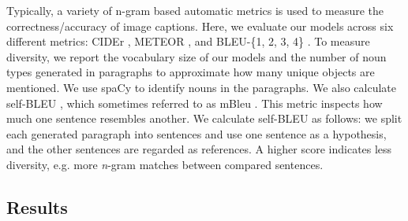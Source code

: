 \documentclass[11pt,a4paper]{article}
\begin{document}
Typically, a variety of n-gram based automatic metrics is used to measure the correctness/accuracy of image captions.
Here, we evaluate our models across six different metrics: CIDEr \cite{vedantam2014cider}, METEOR \cite{meteor14}, and BLEU-\{1, 2, 3, 4\} \cite{bleu}.
To measure diversity, we report the vocabulary size of our models and the number of noun types generated in paragraphs to approximate how many unique objects are mentioned.
We use spaCy \cite{spacy15} to identify nouns in the paragraphs.
We also calculate self-BLEU \cite{Zhu2018selfbleu}, which sometimes referred to as mBleu \cite{Shetty2017}.
This metric inspects how much one sentence resembles another.
We calculate self-BLEU as follows: we split each generated paragraph into sentences and use one sentence as a hypothesis, and the other sentences are regarded as references.
A higher score indicates less diversity, e.g. more \textit{n}-gram matches between compared sentences.



\subsection{Results}
\end{document}
